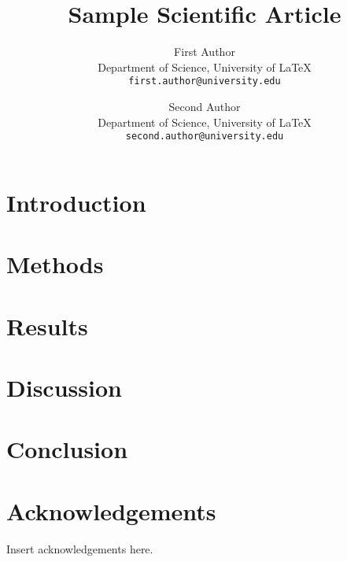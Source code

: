 \documentclass{article}
\title{Sample Scientific Article}
\author{
    First Author \\
    Department of Science, University of LaTeX \\
    \texttt{first.author@university.edu} \\
    \and
    Second Author \\
    Department of Science, University of LaTeX \\
    \texttt{second.author@university.edu}
}
\begin{document}
    \maketitle

    \begin{abstract}
        \lipsum[1]  %
    \end{abstract}

    \section{Introduction}
    \lipsum[2-3]  %

    \section{Methods}
    \lipsum[4-5]  %

    \section{Results}
    \lipsum[6-7]  %

    \section{Discussion}
    \lipsum[8-9]  %

    \section{Conclusion}
    \lipsum[10]  %

    \section*{Acknowledgements}
    Insert acknowledgements here.

\end{document}
